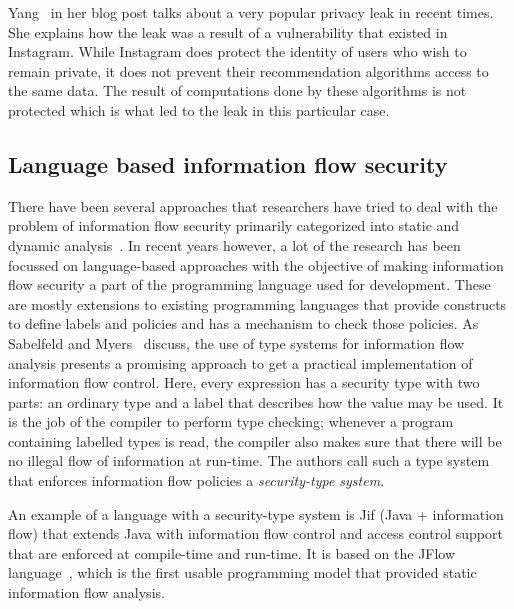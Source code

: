 Yang~\cite{comey} in her blog post talks about a very popular privacy leak in recent
times. She explains how the leak was a result of a vulnerability that existed in
Instagram. While Instagram does protect the identity of users who wish to remain
private, it does not prevent their recommendation algorithms access to the same
data. The result of computations done by these algorithms is not protected which
is what led to the leak in this particular case.


\subsection{Language based information flow security \label{subsec:langinfo}}
There have been several approaches that researchers have tried to deal with the
problem of information flow security primarily categorized into static and dynamic
analysis~\cite{Russo, Chlipala}. In recent years however, a lot of the research has
been focussed on language-based approaches with the objective of making information
flow security a part of the programming language used for development. These are
mostly extensions to existing programming languages that provide constructs to define
labels and policies and has a mechanism to check those policies. As Sabelfeld and
Myers~\cite{LangInfo} discuss, the use of type systems for information flow analysis
presents a promising approach to get a practical implementation of information
flow control. Here, every expression has a security type with two parts:
an ordinary type and a label that describes how the value may be used. It is the
job of the compiler to perform type checking; whenever a program containing labelled
types is read, the compiler also makes sure that there will be no illegal flow of
information at run-time. The authors call such a type system that enforces information
flow policies a \textit{security-type system}.

An example of a language with a security-type system is Jif (Java + information flow)
\cite{jifurl} that extends Java with information flow control and access control support
that are enforced at compile-time and run-time. It is based on the JFlow
language~\cite{Jflow}, which is the first usable programming model that provided
static information flow analysis.

